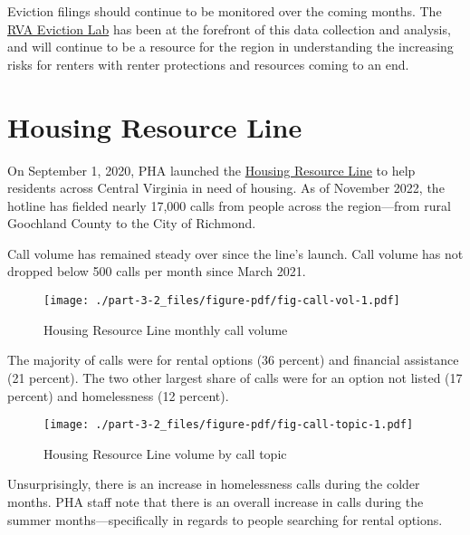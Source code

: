 \documentclass[
  letterpaper,
  DIV=11,
  numbers=noendperiod]{scrreprt}
\begin{document}
Eviction filings should continue to be monitored over the coming months.
The \href{https://rampages.us/rvaevictionlab/}{RVA Eviction Lab} has
been at the forefront of this data collection and analysis, and will
continue to be a resource for the region in understanding the increasing
risks for renters with renter protections and resources coming to an
end.

\hypertarget{housing-resource-line}{%
\section{Housing Resource Line}\label{housing-resource-line}}

On September 1, 2020, PHA launched the
\href{https://pharva.com/housing-hotline/}{Housing Resource Line} to
help residents across Central Virginia in need of housing. As of
November 2022, the hotline has fielded nearly 17,000 calls from people
across the region---from rural Goochland County to the City of Richmond.

Call volume has remained steady over since the line's launch. Call
volume has not dropped below 500 calls per month since March 2021.

\begin{figure}

{\centering \texttt{[image: ./part-3-2\_files/figure-pdf/fig-call-vol-1.pdf]}

}

\caption{\label{fig-call-vol}Housing Resource Line monthly call volume}

\end{figure}

The majority of calls were for rental options (36 percent) and financial
assistance (21 percent). The two other largest share of calls were for
an option not listed (17 percent) and homelessness (12 percent).

\begin{figure}

{\centering \texttt{[image: ./part-3-2\_files/figure-pdf/fig-call-topic-1.pdf]}

}

\caption{\label{fig-call-topic}Housing Resource Line volume by call
topic}

\end{figure}

Unsurprisingly, there is an increase in homelessness calls during the
colder months. PHA staff note that there is an overall increase in calls
during the summer months---specifically in regards to people searching
for rental options.
\end{document}
